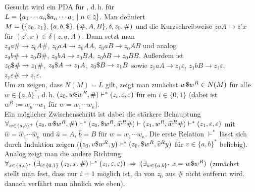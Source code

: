 \begin{Bsp}
    Gesucht wird ein PDA für , d.\,h. für\\
    $L = \{a_1 \dotsb a_n \$ a_n \dotsb a_1 \;|\; n \in \natural\}$.
    Man definiert $M = (\{z_0, z_1\}, \{a, b, \$\}, \{\#, A, B\},
    \delta, z_0, \#)$ und die Kurzschreibweise
    $zaA \rightarrow z'x$ für $(z', x) \in \delta(z, a, A)$.
    Dann setzt man\\
    $z_0 a \# \rightarrow z_0 A \#$,
    $z_0 a A \rightarrow z_0 A A$,
    $z_0 a B \rightarrow z_0 A B$ und analog\\
    $z_0 b \# \rightarrow z_0 B \#$,
    $z_0 b A \rightarrow z_0 B A$,
    $z_0 b B \rightarrow z_0 B B$.
    Außerdem ist\\
    $z_0 \$ \# \rightarrow z_1 \#$,
    $z_0 \$ A \rightarrow z_1 A$,
    $z_0 \$ B \rightarrow z_1 B$ sowie
    $z_1 a A \rightarrow z_1 \varepsilon$,
    $z_1 b B \rightarrow z_1 \varepsilon$,
    $z_1 \varepsilon \# \rightarrow z_1 \varepsilon$.\\
    Um zu zeigen, dass $N(M) = L$ gilt, zeigt man zunächst
    $w \$ w^R \in N(M)$ für alle $w \in \{a, b\}^\ast$, d.\,h.
    $(z_0, w \$ w^R, \#) \vdash^\ast (z_i, \varepsilon, \varepsilon)$
    für ein $i \in \{0, 1\}$
    (dabei ist $w^R := w_n \dotsb w_1$ für $w = w_1 \dotsb w_n$).\\
    Ein möglicher Zwischenschritt ist dabei die stärkere Behauptung\\
    $\forall_{w \in \{a, b\}^+}\; (z_0, w \$ w^R, \#) \vdash^\ast
    (z_0, \$ w^R, \widehat{w}^R \#) \vdash
    (z_1, w^R, \widehat{w}^R \#) \vdash^\ast
    (z_1, \varepsilon, \varepsilon)$ mit
    $\widehat{w} = \widehat{w}_1 \dotsb \widehat{w}_n$ und
    $\widehat{a} = A$, $\widehat{b} = B$ für $w = w_1 \dotsb w_n$.
    Die erste Relation $\vdash^\ast$ lässt sich durch Induktion zeigen
    ($(z_0, v \$ w^R, y) \vdash^\ast
    (z_0, \$ w^R, \widehat{v}^R y)$ für $v \in \{a, b\}^\ast$ beliebig).
    Analog zeigt man die andere Richtung\\
    $\forall_{x \in \{a, b\}^\ast}\; (\exists_{i \in \{0, 1\}}\;
    (z_0, x, \#) \vdash^\ast (z_i, \varepsilon, \varepsilon)) \;\Rightarrow\;
    (\exists_{w \in \{a, b\}^\ast}\; x = w \$ w^R)$
    (zunächst stellt man fest, dass nur $i = 1$ möglich ist, da
    von $z_0$ aus $\#$ nicht entfernt wird, danach verfährt man ähnlich wie
    eben).
\end{Bsp}

